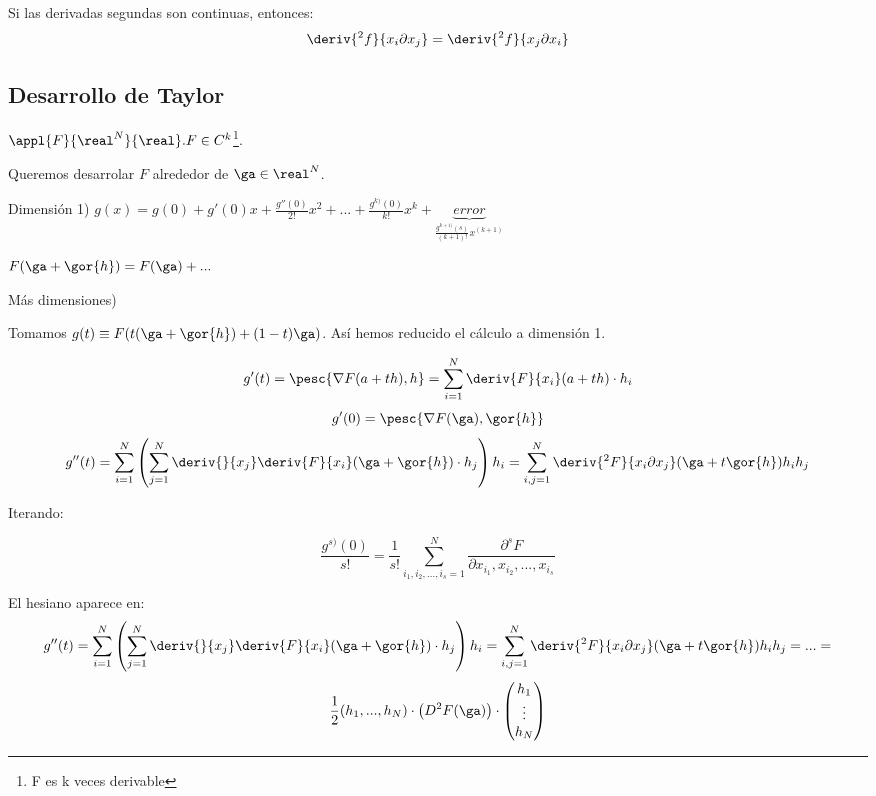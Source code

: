 \documentclass{apuntes}
\begin{document}
\begin{theorem}
Si las derivadas segundas son continuas, entonces:
$$\deriv{^2f}{x_i\partial x_j} = \deriv{^2 f}{x_j \partial x_i}$$
\end{theorem}



\subsection{Desarrollo de Taylor}

$\appl{F}{\real^N}{\real}. F\in C^k$\footnote{F es k veces derivable}. 

Queremos desarrolar $F$ alrededor de $\ga \in \real^N$.

Dimensión 1) $g(x) = g(0) + g'(0)x + \frac{g''(0)}{2!}x^2 + ... + \frac{g^{k)}(0)}{k!}x^k + \underbrace{error}_{\frac{g^{k+1)}(s)}{(k+1)!}x^{(k+1)}}$

$F(\ga + \gor{h}) = F(\ga) + ...$

Más dimensiones) 

Tomamos $g(t) \equiv F(t(\ga + \gor{h}) + (1-t)\ga)$. Así hemos reducido el cálculo a dimensión 1.


$$g'(t) = \pesc{\nabla F(a+th),h} = \sum_{i=1}^N \deriv{F}{x_i}(a+th)\cdot h_i$$
$$g'(0) = \pesc{\nabla F(\ga), \gor{h}}$$
$$g''(t) = \sum_{i=1}^N\left(\sum_{j=1}^N \deriv{}{x_j}\deriv{F}{x_i}(\ga+\gor{h})\cdot{h_j}\right)h_i = \sum_{i,j = 1}^N \deriv{^2F}{x_i \partial x_j}(\ga+t\gor{h})h_ih_j $$

Iterando:

$$\frac{g^{s)} (0)}{s!} = \frac{1}{s!}\sum_{i_1,i_2,...,i_s=1}^N \frac{\partial^s F}{\partial x_{i_1},x_{i_2},...,x_{i_s}}
$$%
                                                                                          
El hesiano aparece en:
$$g''(t) = \sum_{i=1}^N\left(\sum_{j=1}^N \deriv{}{x_j}\deriv{F}{x_i}(\ga+\gor{h})\cdot{h_j}\right)h_i = \sum_{i,j = 1}^N \deriv{^2F}{x_i \partial x_j}(\ga+t\gor{h})h_ih_j = ... =
$$$$\frac{1}{2} (h_1,...,h_N) \cdot \left(D^2F(\ga)\right) \cdot \begin{pmatrix}
h_1\\
\vdots\\
h_N                                                                                                                                                                                                                                       \end{pmatrix}
$$
\end{document}
